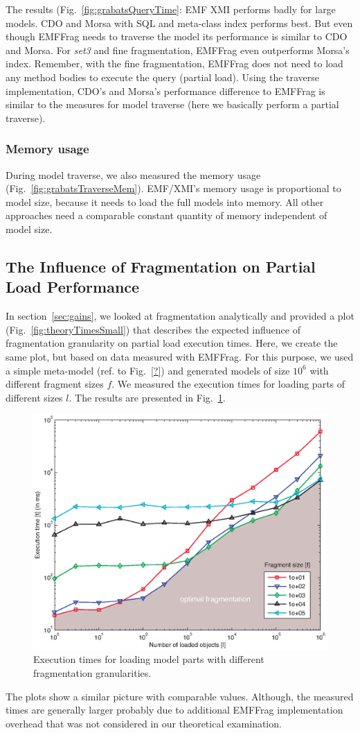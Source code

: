 The results (Fig.~\ref{fig:grabatsQueryTime}: EMF XMI performs badly for large models. CDO and Morsa with SQL and meta-class index performs best. But even though EMFFrag needs to traverse the model its performance is similar to CDO and Morsa. For \emph{set3} and fine fragmentation, EMFFrag even outperforms Morsa's index. Remember, with the fine fragmentation, EMFFrag does not need to load any method bodies to execute the query (partial load). Using the traverse implementation, CDO's and Morsa's performance difference to EMFFrag is similar to the measures for model traverse (here we basically perform a partial traverse).  

\subsubsection*{Memory usage} During model traverse, we also measured the memory usage (Fig.~\ref{fig:grabatsTraverseMem}). EMF/XMI's memory usage is proportional to model size, because it needs to load the full models into memory. All other approaches need a comparable constant quantity of memory independent of model size.


\subsection{The Influence of Fragmentation on Partial Load Performance}

In section~\ref{sec:gains}, we looked at fragmentation analytically and provided a plot (Fig.~\ref{fig:theoryTimesSmall}) that describes the expected influence of fragmentation granularity on partial load execution times. Here, we create the same plot, but based on data measured with EMFFrag. For this purpose, we used a simple meta-model (ref. to Fig.~\ref{?}) and generated models of size $10^6$ with different fragment sizes $f$. We measured the execution times for loading parts of different sizes $l$. The results are presented in Fig.~\ref{fig:measureTimeExtra}.

\begin{figure}
  \centering
  \includegraphics[width=0.65\linewidth]{figures/measureTimesExtra}
  \caption{Execution times for loading model parts with different fragmentation granularities.}
  \label{fig:measureTimeExtra}
\end{figure}

The plots show a similar picture with comparable values. Although, the measured times are generally larger probably due to additional EMFFrag implementation overhead that was not considered in our theoretical examination.
